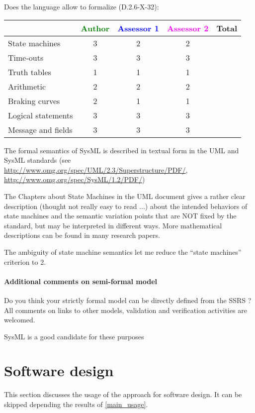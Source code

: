 Does the language allow to formalize (D.2.6-X-32):

\begin{tabular}{|l | c | c | c | c|}
\hline
& \textcolor{green}{Author} & \textcolor{blue}{Assessor 1} & \textcolor{magenta}{Assessor 2} & Total \\
\hline 
State machines  &3 & 2& 2&  \\
\hline
Time-outs  &3 & 3& 3&  \\
\hline
Truth tables  &1 & 1& 1&  \\
\hline
Arithmetic  & 2& 2& 2&  \\
\hline
Braking curves  &2 & 1& 1&  \\
\hline
Logical statements &3 & 3& 3&  \\
\hline
Message and fields &3 & 3& 3&  \\
\hline
\end{tabular}
\begin{author_comment}

The formal semantics of SysML is described in textual form in the UML and SysML standards
(see \url{http://www.omg.org/spec/UML/2.3/Superstructure/PDF/}, \url{http://www.omg.org/spec/SysML/1.2/PDF/})

The Chapters about State Machines in the UML
document gives a rather clear description (thought not really easy
to read ...) about the intended behaviors of state machines and the
semantic variation points that are NOT fixed by the standard, but may
be interpreted in different ways. More mathematical descriptions can
be found in  many research papers.
\end{author_comment}

\begin{assessor1}
The ambiguity of state machine semantics let me reduce the "`state machines"' criterion to 2. 
\end{assessor1}


\paragraph{Additional comments on semi-formal  model} Do you think your strictly formal  model can be directly defined from the SSRS ?
All comments on links to  other models, validation and verification activities are welcomed.

\begin{author_comment}
SysML is a good candidate for these purposes
\end{author_comment}
\section{Software design}
This section discusses the usage of the approach for software design.
It can be skipped depending the results of \ref{main_usage}.

